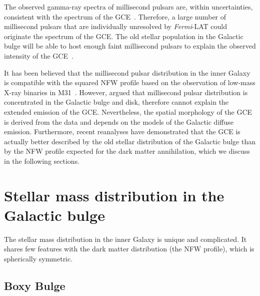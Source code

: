 \documentclass[doublespace,nopageskip]{VTthesis} %
\begin{document}
The observed gamma-ray spectra of millisecond pulsars are, within uncertainties, consistent with the spectrum of the GCE~\cite{2011JCAP...03..010A}. Therefore, a large number of millisecond pulsars that are individually unresolved by \textit{Fermi}-LAT could originate the spectrum of the GCE. The old stellar population in the Galactic bulge will be able to host enough faint millisecond pulsars to explain the observed intensity of the GCE~\cite{2018ApJ...863..199G,2020JCAP...12..035P}.

It has been believed that the millisecond pulsar distribution in the inner Galaxy is compatible with the squared NFW profile based on the observation of low-mass X-ray binaries in M31~\cite{2012PhRvD..86h3511A}. However, \citet{2013PhRvD..88h3009H} argued that millisecond pulsar distribution is concentrated in the Galactic bulge and disk, therefore cannot explain the extended emission of the GCE. Nevertheless, the spatial morphology of the GCE is derived from the data and depends on the models of the Galactic diffuse emission. Furthermore, recent reanalyses have demonstrated that the GCE is actually better described by the old stellar distribution of the Galactic bulge than by the NFW profile expected for the dark matter annihilation, which we discuss in the following sections.





\section{Stellar mass distribution in the Galactic bulge}\label{se:bulge_model}

The stellar mass distribution in the inner Galaxy is unique and complicated. It shares few features with the dark matter distribution (the NFW profile), which is spherically symmetric.

\subsection{Boxy Bulge}
\end{document}
